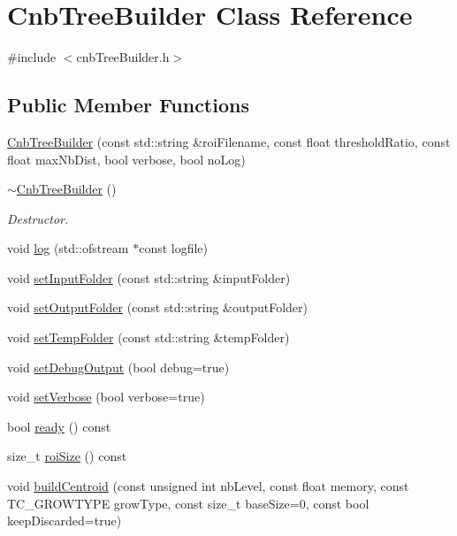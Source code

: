 \hypertarget{classCnbTreeBuilder}{\section{\-Cnb\-Tree\-Builder \-Class \-Reference}
\label{classCnbTreeBuilder}
}


{\ttfamily \#include $<$cnb\-Tree\-Builder.\-h$>$}

\subsection*{\-Public \-Member \-Functions}
\begin{DoxyCompactItemize}
\item 
\hyperlink{classCnbTreeBuilder_a0ef0e3aef78372fe59c00b449302b174}{\-Cnb\-Tree\-Builder} (const std\-::string \&roi\-Filename, const float threshold\-Ratio, const float max\-Nb\-Dist, bool verbose, bool no\-Log)
\item 
\hypertarget{classCnbTreeBuilder_a8681218362a7098350dc876d5e2f131f}{\hyperlink{classCnbTreeBuilder_a8681218362a7098350dc876d5e2f131f}{$\sim$\-Cnb\-Tree\-Builder} ()}\label{classCnbTreeBuilder_a8681218362a7098350dc876d5e2f131f}

\begin{DoxyCompactList}\small\item\em \-Destructor. \end{DoxyCompactList}\item 
void \hyperlink{classCnbTreeBuilder_a2dc53ff12d103b32a3994fbcf4a83964}{log} (std\-::ofstream $\ast$const logfile)
\item 
void \hyperlink{classCnbTreeBuilder_afbc817c61bb7960f0012869da7ed5778}{set\-Input\-Folder} (const std\-::string \&input\-Folder)
\item 
void \hyperlink{classCnbTreeBuilder_a6ef8fd27f50b20b04372c75922b4e27e}{set\-Output\-Folder} (const std\-::string \&output\-Folder)
\item 
void \hyperlink{classCnbTreeBuilder_a16d5a7ba17efe63a88bbcd5515c8dc46}{set\-Temp\-Folder} (const std\-::string \&temp\-Folder)
\item 
void \hyperlink{classCnbTreeBuilder_a10fa1d4671bbd2053d8227e639acf8a6}{set\-Debug\-Output} (bool debug=true)
\item 
void \hyperlink{classCnbTreeBuilder_afc62996ab9d2d6d587a355dd8f11fc1f}{set\-Verbose} (bool verbose=true)
\item 
bool \hyperlink{classCnbTreeBuilder_aa86d9a360c514e227384c5af5935ce73}{ready} () const 
\item 
size\-\_\-t \hyperlink{classCnbTreeBuilder_a7091a8c25fd83c93d4fa33f4c60f4f02}{roi\-Size} () const 
\item 
void \hyperlink{classCnbTreeBuilder_afe543234a9bbfe263bff06b21998c4a9}{build\-Centroid} (const unsigned int nb\-Level, const float memory, const \-T\-C\-\_\-\-G\-R\-O\-W\-T\-Y\-P\-E grow\-Type, const size\-\_\-t base\-Size=0, const bool keep\-Discarded=true)
\end{DoxyCompactItemize}


